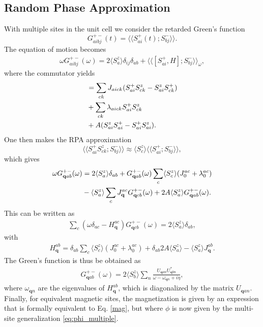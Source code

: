 \documentclass[aps,prb,reprint,floatfix,superscriptaddress]{revtex4-2}
\begin{document}
\subsection{Random Phase Approximation}
With multiple sites in the unit cell we consider the retarded Green's function
\begin{equation}
    G^{+-}_{aibj}(t) = \langle \langle S_{ai}^+(t) ; S_{bj}^-\rangle \rangle.
\end{equation}
The equation of motion becomes
\begin{align}
    \omega G^{+-}_{aibj}(\omega) = 2 \langle S_a^z \rangle \delta_{ij} \delta_{ab} + \langle \langle [S_{ai}^+,H] ; S_{bj}^- \rangle \rangle_\omega,
\end{align}
where the commutator yields
\begin{align}
    [S_{ai}^+,H] &= \sum_{ck} J_{aick} ( S_{ai}^+ S_{ck}^z  - S_{ai}^zS_{ck}^+ ) \notag\\ &+ \sum_{ck} \lambda_{aick} S_{ai}^+ S_{ck}^z \notag \\& + A(S_{ai}^z S_{ai}^+ -  S_{ai}^+S_{ai}^z).
\end{align}
One then makes the RPA approximation
\begin{equation}
     \langle \langle S_{ai}^+ S_{ck}^z  ; S_{bj}^-  \rangle \rangle \approx \langle S^z_c \rangle \langle \langle S_{ai}^+  ; S_{bj}^- \rangle \rangle,
\end{equation}
which gives
\begin{align}
    \omega G^{+-}_{\mathbf{q}ab}(\omega) &=2 \langle S_a^z \rangle \delta_{ab} +  G^{+-}_{\mathbf{q}ab}(\omega)\sum_c \langle S_c^z \rangle (J^{ac}_0 + \lambda^{ac}_0 )  \notag\\
    &- \langle S_a^z\rangle \sum_c J^{ac}_\mathbf{q} G^{+-}_{\mathbf{q}cb}(\omega) + 2A \langle S_a^z \rangle G^{+-}_{\mathbf{q}ab}(\omega).
\end{align}
This can be written as
\begin{align}\label{eqnGfn2site}
    \sum_c(\omega\delta_{ac} -H_{\mathbf{q}}^{ac})G^{+-}_{\mathbf{q}cb}(\omega) =2 \langle S_a^z \rangle \delta_{ab},
\end{align}
with
\begin{align}\label{multisite-H_rpa}    H_{\mathbf{q}}^{ab}=\delta_{ab}\sum_c \langle S_c^z \rangle (J^{ac}_0 + \lambda^{ac}_0 ) + \delta_{ab}2A \langle S_a^z \rangle - \langle S_a^z\rangle J^{ab}_\mathbf{q}.
\end{align}
The Green's function is thus be obtained as
\begin{align}\label{multi-site-Gfn}
    G^{+-}_{\mathbf{q}ab}(\omega) =2\langle S_b^z \rangle\sum_n \frac{U_{\mathbf{q}an}U^*_{\mathbf{q}bn}}{\omega-\omega_{\mathbf{q}n}+i\eta},
\end{align}
where $\omega_{\mathbf{q}n}$ are the eigenvalues of $H_{\mathbf{q}}^{ab}$, which is diagonalized by the matrix $U_{\mathbf{q}an}$. Finally, for equivalent magnetic sites, the magnetization is given by an expression that is formally equivalent to Eq. \eqref{mag}, but where $\phi$ is now given by the multi-site generalization \eqref{eq:phi_multiple}.
\end{document}
